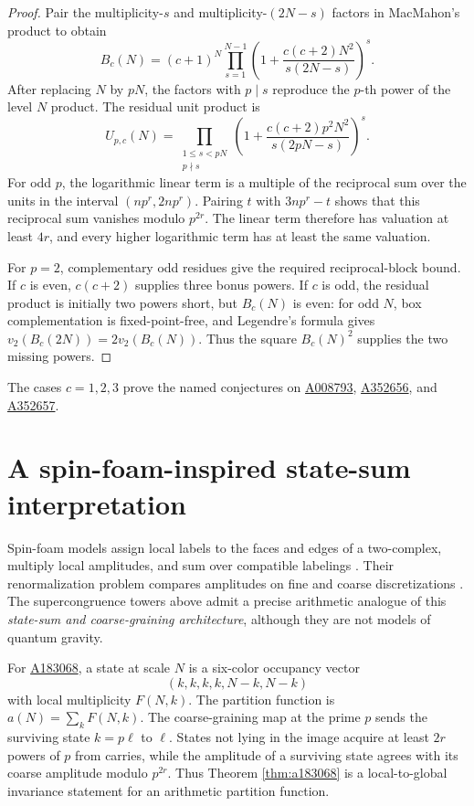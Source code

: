 \documentclass[11pt]{article}
\theoremstyle{definition}
\newcommand{\OEIS}[1]{\href{https://oeis.org/#1}{#1}}
\begin{document}
\begin{proof}
Pair the multiplicity-$s$ and multiplicity-$(2N-s)$ factors in MacMahon's
product to obtain
\[
 B_c(N)=(c+1)^N\prod_{s=1}^{N-1}
 \left(1+\frac{c(c+2)N^2}{s(2N-s)}\right)^s.
\]
After replacing $N$ by $pN$, the factors with $p\mid s$ reproduce the
$p$-th power of the level $N$ product.  The residual unit product is
\[
 U_{p,c}(N)=\prod_{\substack{1\leq s<pN\\p\nmid s}}
 \left(1+\frac{c(c+2)p^2N^2}{s(2pN-s)}\right)^s.
\]
For odd $p$, the logarithmic linear term is a multiple of the reciprocal
sum over the units in the interval $(np^r,2np^r)$.  Pairing $t$ with
$3np^r-t$ shows that this reciprocal sum vanishes modulo $p^{2r}$.
The linear term therefore has valuation at least $4r$, and every higher
logarithmic term has at least the same valuation.

For $p=2$, complementary odd residues give the required reciprocal-block
bound.  If $c$ is even, $c(c+2)$ supplies three bonus powers.  If $c$ is
odd, the residual product is initially two powers short, but $B_c(N)$ is
even: for odd $N$, box complementation is fixed-point-free, and Legendre's
formula gives $v_2(B_c(2N))=2v_2(B_c(N))$.  Thus the square
$B_c(N)^2$ supplies the two missing powers.
\end{proof}

The cases $c=1,2,3$ prove the named conjectures on \OEIS{A008793},
\OEIS{A352656}, and \OEIS{A352657}.

\section{A spin-foam-inspired state-sum interpretation}

Spin-foam models assign local labels to the faces and edges of a
two-complex, multiply local amplitudes, and sum over compatible labelings
\cite{BaezSpinFoam,PerezSpinFoam}.  Their renormalization problem compares
amplitudes on fine and coarse discretizations \cite{Steinhaus}.  The
supercongruence towers above admit a precise arithmetic analogue of this
\emph{state-sum and coarse-graining architecture}, although they are not
models of quantum gravity.

For \OEIS{A183068}, a state at scale $N$ is a six-color occupancy vector
\[
 (k,k,k,k,N-k,N-k)
\]
with local multiplicity $F(N,k)$.  The partition function is
$a(N)=\sum_kF(N,k)$.  The coarse-graining map at the prime $p$ sends the
surviving state $k=p\ell$ to $\ell$.  States not lying in the image acquire
at least $2r$ powers of $p$ from carries, while the amplitude of a surviving
state agrees with its coarse amplitude modulo $p^{2r}$.  Thus Theorem
\ref{thm:a183068} is a local-to-global invariance statement for an
arithmetic partition function.
\end{document}

